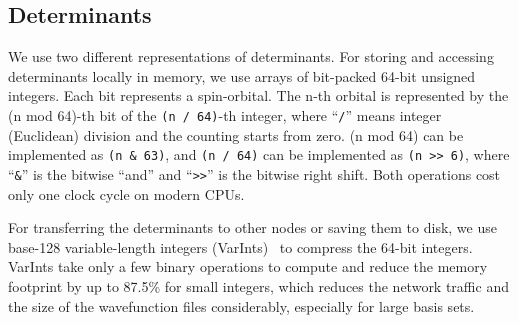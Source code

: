 \documentclass[%
reprint,
 superscriptaddress,
 amsmath,amssymb,
 aps,
]{revtex4-1}
\begin{document}
\subsection{Determinants}
\label{{sec:det}}
%
%

We use two different representations of determinants.
For storing and accessing determinants locally in memory, we use arrays of bit-packed 64-bit unsigned integers.
Each bit represents a spin-orbital.
The n-th orbital is represented by the (n mod 64)-th bit of
the \lstinline{(n / 64)}-th integer, where ``\lstinline{/}'' means integer (Euclidean) division and the counting starts from zero.
(n mod 64) can be implemented as \lstinline{(n & 63)}, and \lstinline{(n / 64)} can be implemented as \lstinline{(n >> 6)},
where ``\lstinline{&}'' is the bitwise ``and'' and ``\lstinline{>>}'' is the bitwise right shift.
Both operations cost only one clock cycle on modern CPUs.

For transferring the determinants to other nodes or saving them to disk, we use base-128 variable-length integers
(VarInts)~\cite{StuFer-Protobuf-12} to compress the 64-bit integers.
VarInts take only a few binary operations to compute and reduce the memory footprint by up to 87.5\% for small integers, which reduces the network traffic and the size of the wavefunction files considerably, especially for large basis sets.
\end{document}
